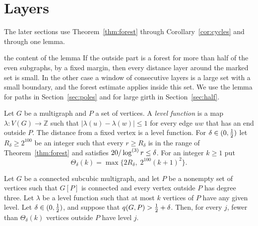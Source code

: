 \section{Layers}\label{sec:layers}

The later sections use Theorem~\ref{thm:forest} through Corollary~\ref{cor:cycles} and through
one lemma.

\begin{idea}{the content of the lemma}
If the outside part is a forest for more than half of the even subgraphs, by a fixed margin, then
every distance layer around the marked set is small. In the other case a window of consecutive layers is a large set
with a small boundary, and the forest estimate applies inside this set. We use the lemma for
paths in Section~\ref{sec:poles} and for large girth in Section~\ref{sec:half}.
\end{idea}

Let $G$ be a multigraph and $P$ a set of vertices. A \emph{level function} is a map
$\lambda\colon V(G)\to\mathbb{Z}$ such that $|\lambda(u)-\lambda(w)|\le1$ for every edge $uw$ that
has an end outside $P$. The distance from a fixed vertex is a level function. For
$\delta\in(0,\tfrac12)$ let $R_\delta\ge2^{100}$ be an integer such that every $r\ge R_\delta$ is in
the range of Theorem~\ref{thm:forest} and satisfies $20/\log^{(3)}r\le\delta$. For an integer $k\ge1$
put
\[
  \Theta_\delta(k)=\max\bigl\{2R_\delta,\;2^{100}(k+1)^{2}\bigr\}.
\]

\begin{lemma}[Layers]\label{lem:width}
Let $G$ be a connected subcubic multigraph, and let $P$ be a nonempty set of vertices such that
$G[P]$ is connected and every vertex outside $P$ has degree three. Let $\lambda$ be a level
function such that at most $k$ vertices of $P$ have any given level. Let $\delta\in(0,\tfrac12)$, and
suppose that $q(G,P)>\tfrac12+\delta$. Then, for every $j$, fewer than $\Theta_\delta(k)$ vertices
outside $P$ have level $j$.
\end{lemma}

